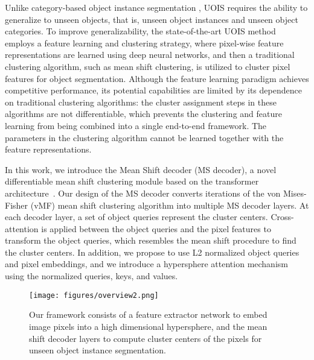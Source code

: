 \documentclass[letterpaper, 10 pt, conference]{ieeeconf}
\begin{document}
Unlike category-based object instance segmentation \cite{he2017mask, Carion2020, tian2020conditional, vaswani2017attention, jia2016dynamic, cheng2021per, cheng2022masked}, UOIS requires the ability to generalize to unseen objects, that is, unseen object instances and unseen object categories. To improve generalizability, the state-of-the-art UOIS method~\cite{xiang2020learning} employs a feature learning and clustering strategy, where pixel-wise feature representations are learned using deep neural networks, and then a traditional clustering algorithm, such as mean shift clustering, is utilized to cluster pixel features for object segmentation. Although the feature learning paradigm achieves competitive performance, its potential capabilities are limited by its dependence on traditional clustering algorithms: the cluster assignment steps in these algorithms are not differentiable, which prevents the clustering and feature learning from being combined into a single end-to-end framework. The parameters in the clustering algorithm cannot be learned together with the feature representations.



In this work, we introduce the Mean Shift decoder (MS decoder), a novel differentiable mean shift clustering module based on the transformer architecture~\cite{vaswani2017attention}. Our design of the MS decoder converts iterations of the von Mises-Fisher (vMF) mean shift clustering algorithm into multiple MS decoder layers. At each decoder layer, a set of object queries represent the cluster centers. Cross-attention is applied between the object queries and the pixel features to transform the object queries, which resembles the mean shift procedure to find the cluster centers. In addition, we propose to use L2 normalized object queries and pixel embeddings, and we introduce a hypersphere attention mechanism using the normalized queries, keys, and values. 






\begin{figure}
    \centering
    \texttt{[image: figures/overview2.png]}
    \vspace{-2mm}
    \caption{Our framework consists of a feature extractor network to embed image pixels into a high dimensional hypersphere, and the mean shift decoder layers to compute cluster centers of the pixels for unseen object instance segmentation.}
    \label{fig:intro}
    \vspace{-7mm}
\end{figure}
\end{document}
